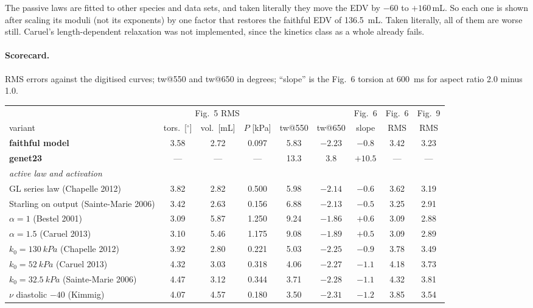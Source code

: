 \documentclass[10pt]{article}
\begin{document}
The passive laws are fitted to other species and data sets, and taken literally they move the EDV
by $-60$ to $+160$\,mL. So each one is shown after scaling its moduli (not its exponents) by
one factor that restores the faithful EDV of \SI{136.5}{mL}. Taken literally, all of them are
worse still.
Caruel's length-dependent relaxation was not implemented, since the kinetics class as a whole
already fails.

\paragraph{Scorecard.} RMS errors against the digitised curves; tw@550 and tw@650 in degrees;
``slope'' is the Fig.~6 torsion at \SI{600}{ms} for aspect ratio 2.0 minus 1.0.
\begin{center}\footnotesize\setlength{\tabcolsep}{3.5pt}\begin{longtable}{lcccccccc}
\toprule
 & \multicolumn{3}{c}{Fig.~5 RMS} & & & Fig.~6 & Fig.~6 & Fig.~9 \\
variant & tors.\ [$^\circ$] & vol.\ [mL] & $P$ [kPa] & tw@550 & tw@650 & slope & RMS & RMS \\ \midrule
\textbf{faithful model} & 3.58 & 2.72 & 0.097 & 5.83 & $-2.23$ & $-0.8$ & 3.42 & 3.23 \\
\textbf{genet23} & --- & --- & --- & 13.3 & 3.8 & $+10.5$ & --- & --- \\ \midrule
\multicolumn{9}{l}{\emph{active law and activation}} \\
GL series law (Chapelle 2012) & 3.82 & 2.82 & 0.500 & 5.98 & $-2.14$ & $-0.6$ & 3.62 & 3.19 \\
Starling on output (Sainte-Marie 2006) & 3.42 & 2.63 & 0.156 & 6.88 & $-2.13$ & $-0.5$ & 3.25 & 2.91 \\
$\alpha=1$ (Bestel 2001) & 3.09 & 5.87 & 1.250 & 9.24 & $-1.86$ & $+0.6$ & 3.09 & 2.88 \\
$\alpha=1.5$ (Caruel 2013) & 3.10 & 5.46 & 1.175 & 9.08 & $-1.89$ & $+0.5$ & 3.09 & 2.89 \\
$k_0=\SI{130}{kPa}$ (Chapelle 2012) & 3.92 & 2.80 & 0.221 & 5.03 & $-2.25$ & $-0.9$ & 3.78 & 3.49 \\
$k_0=\SI{52}{kPa}$ (Caruel 2013) & 4.32 & 3.03 & 0.318 & 4.06 & $-2.27$ & $-1.1$ & 4.18 & 3.73 \\
$k_0=\SI{32.5}{kPa}$ (Sainte-Marie 2006) & 4.47 & 3.12 & 0.344 & 3.71 & $-2.28$ & $-1.1$ & 4.32 & 3.81 \\
$\nu$ diastolic $-40$ (Kimmig) & 4.07 & 4.57 & 0.180 & 3.50 & $-2.31$ & $-1.2$ & 3.85 & 3.54 \\

\end{longtable}
\end{center}
\end{document}
